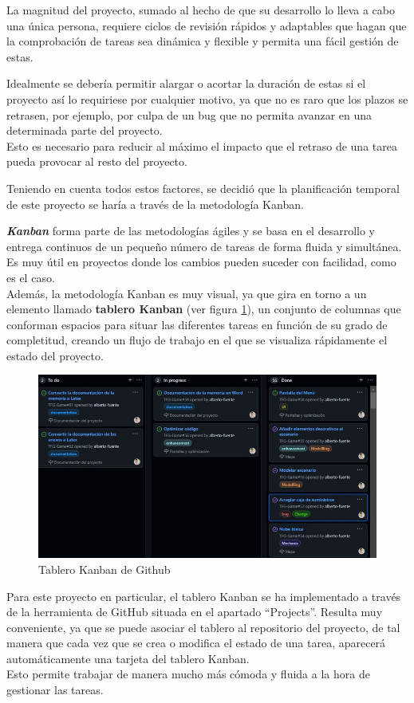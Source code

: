 La magnitud del proyecto, sumado al hecho de que su desarrollo lo lleva a cabo una única persona, requiere ciclos de revisión rápidos y adaptables que hagan que la comprobación de tareas sea dinámica y flexible y permita una fácil gestión de estas.

Idealmente se debería permitir alargar o acortar la duración de estas si el proyecto así lo requiriese por cualquier motivo, ya que no es raro que los plazos se retrasen, por ejemplo, por culpa de un bug que no permita avanzar en una determinada parte del proyecto.\\ Esto es necesario para reducir al máximo el impacto que el retraso de una tarea pueda provocar al resto del proyecto.

Teniendo en cuenta todos estos factores, se decidió que la planificación temporal de este proyecto se haría a través de la metodología Kanban.

\textbf{\textit{Kanban}} \cite{wiki:Kanban} forma parte de las metodologías ágiles y se basa en el desarrollo y entrega continuos de un pequeño número de tareas de forma fluida y simultánea. Es muy útil en proyectos donde los cambios pueden suceder con facilidad, como es el caso.\\
Además, la metodología Kanban es muy visual, ya que gira en torno a un elemento llamado \textbf{tablero Kanban} (ver figura \ref{fig:TableroKanban}), un conjunto de columnas que conforman espacios para situar las diferentes tareas en función de su grado de completitud, creando un flujo de trabajo en el que se visualiza rápidamente el estado del proyecto.
\begin{figure}[h]
	\centering
	\includegraphics[scale=0.45]{img/KanbanBoard.jpg}
	\caption{Tablero Kanban de Github}
	\label{fig:TableroKanban}
    \end{figure}
Para este proyecto en particular, el tablero Kanban se ha implementado a través de la herramienta de GitHub situada en el apartado ``Projects''. Resulta muy conveniente, ya que se puede asociar el tablero al repositorio del proyecto, de tal manera que cada vez que se crea o modifica el estado de una tarea, aparecerá automáticamente una tarjeta del tablero Kanban.\\
Esto permite trabajar de manera mucho más cómoda y fluida a la hora de gestionar las tareas. 

